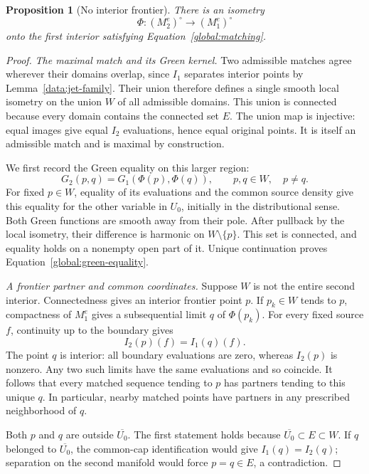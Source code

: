 \documentclass[11pt]{article}
\newtheorem{proposition}[theorem]{Proposition}
\theoremstyle{definition}
\theoremstyle{remark}
\numberwithin{equation}{section}
\begin{document}
\begin{proposition}[No interior frontier]\label{global:frontier}
There is an isometry
\[
 \Phi:(M_2^e)^\circ\longrightarrow(M_1^e)^\circ
\]
onto the first interior satisfying Equation~\eqref{global:matching}.
\end{proposition}

\begin{proof}
\emph{The maximal match and its Green kernel.}\quad
Two admissible matches agree wherever their domains overlap, since
$I_1$ separates interior points by Lemma~\ref{data:jet-family}.
Their union therefore defines a single smooth local isometry on
the union $W$ of all admissible domains. This union is connected
because every domain contains the connected set $E$. The union
map is injective: equal images give equal $I_2$ evaluations, hence
equal original points. It is itself an admissible match and is
maximal by construction.

We first record the Green equality on this larger region:
\begin{equation}\label{global:green-equality}
 G_2(p,q)=G_1(\Phi(p),\Phi(q)),
             \qquad p,q\in W,\quad p\ne q.
\end{equation}
For fixed $p\in W$, equality of its evaluations and the common
source density give this equality for the other variable in $U_0$,
initially in the distributional sense. Both Green functions are
smooth away from their pole. After pullback by the local isometry,
their difference is harmonic on $W\setminus\{p\}$. This set is
connected, and equality holds on a nonempty open part of it.
Unique continuation proves Equation~\eqref{global:green-equality}.

\emph{A frontier partner and common coordinates.}\quad
Suppose $W$ is not the entire second interior. Connectedness gives
an interior frontier point $p$. If $p_k\in W$ tends to $p$,
compactness of $M_1^e$ gives a subsequential limit $q$ of
$\Phi(p_k)$. For every fixed source $f$, continuity up to the
boundary gives
\[
 I_2(p)(f)=I_1(q)(f).
\]
The point $q$ is interior: all boundary evaluations are zero,
whereas $I_2(p)$ is nonzero. Any two such limits have the same
evaluations and so coincide. It follows that every matched sequence
tending to $p$ has partners tending to this unique $q$.
In particular, nearby matched points have partners in any prescribed
neighborhood of $q$.

Both $p$ and $q$ are outside $\overline{U_0}$. The first statement
holds because $\overline{U_0}\subset E\subset W$. If $q$ belonged
to $\overline{U_0}$, the common-cap identification would give
$I_1(q)=I_2(q)$; separation on the second manifold would force
$p=q\in E$, a contradiction.


\end{proof}
\end{document}
